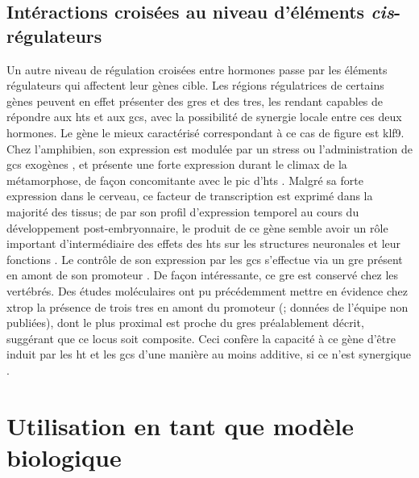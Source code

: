 \documentclass[../main.tex]{subfiles}
\begin{document}
\subsection{Intéractions croisées au niveau d'éléments \textit{cis}-régulateurs}
Un autre niveau de régulation croisées entre hormones passe par les éléments régulateurs qui affectent leur gènes cible.
Les régions régulatrices de certains gènes peuvent en effet présenter des \glspl{gre} et des \glspl{tre}, les rendant capables de répondre aux \glspl{ht} et aux \glspl{gc}, avec la possibilité de synergie locale entre ces deux hormones.
Le gène le mieux caractérisé correspondant à ce cas de figure est \gls{klf9}.
Chez l'amphibien, son expression est modulée par un stress ou l'administration de \glspl{gc} exogènes \citep{Bonett2009}, et présente une forte expression durant le climax de la métamorphose, de façon concomitante avec le pic d'\glspl{ht} \citep{Das2009}.
Malgré sa forte expression dans le cerveau, ce facteur de transcription est exprimé dans la majorité des tissus; de par son profil d'expression temporel au cours du développement post-embryonnaire, le produit de ce gène semble avoir un rôle important d'intermédiaire des effets des \glspl{ht} sur les structures neuronales et leur fonctions \citep{Denver1999,Cayrou2002}.
Le contrôle de son expression par les \glspl{gc} s'effectue via un \gls{gre} présent en amont de son promoteur \citep{Bagamasbad2012}.
De façon intéressante, ce \gls{gre} est conservé chez les vertébrés.
Des études moléculaires ont pu précédemment mettre en évidence chez \gls{xtrop} la présence de trois \glspl{tre} en amont du promoteur (\citealp{Furlow2002}; données de l'équipe non publiées), dont le plus proximal est proche du \glspl{gre} préalablement décrit, suggérant que ce locus soit composite.
Ceci confère la capacité à ce gène d'être induit par les \gls{ht} et les \glspl{gc} d'une manière au moins additive, si ce n'est synergique \citep{Bonett2010}.




\section{Utilisation en tant que modèle biologique}
\end{document}
